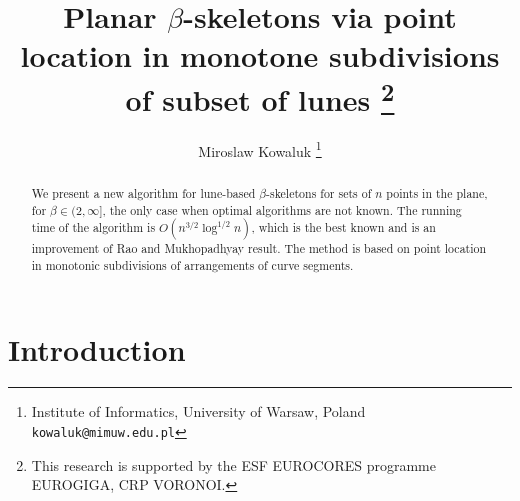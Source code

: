 \documentclass[10pt]{article}
\title{Planar $\beta$-skeletons via point location in monotone subdivisions
of subset of lunes
\thanks{This research is supported by the ESF EUROCORES programme EUROGIGA, CRP VORONOI.}}
\author{
        Miroslaw Kowaluk 
        \thanks{Institute of Informatics, University of Warsaw, Poland {\tt kowaluk@mimuw.edu.pl}}
}
\begin{document}
\maketitle

\begin{abstract}
We present a  new algorithm for lune-based $\beta$-skeletons for sets of $n$ points in the plane,
for  $\beta \in (2,\infty]$,  the only case when optimal algorithms are not known. 
The running time  of the algorithm is $O(n^{3/2} \log^{1/2} n)$, which is the best known
and is an improvement of Rao and Mukhopadhyay \cite{rm97} result.
The method is based on point location in monotonic subdivisions of arrangements of curve segments. 
\end{abstract}

\section{Introduction}
\end{document}
